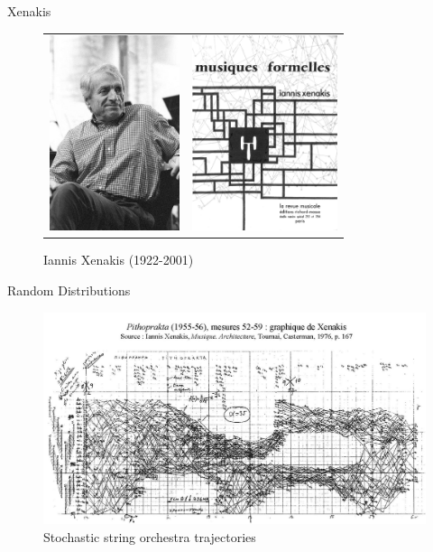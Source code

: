 \begin{frame}{Xenakis}
    \begin{figure}
    \begin{centering}
    \begin{tabular}{cc}
    \includegraphics[height=2.25in]{assets/include-xenakis-portrait.jpg}
    &
    \includegraphics[height=2.25in]{assets/include-xenakis-formalized-music.jpg}
    \end{tabular}
    \caption{Iannis Xenakis (1922-2001)}
    \end{centering}
    \end{figure}
\end{frame}

\begin{frame}{Random Distributions}
    \begin{figure}
    \begin{centering}
    \includegraphics[max width=\linewidth]{assets/include-xenakis-pithoprakta.jpg}
    \caption{Stochastic string orchestra trajectories}
    \end{centering}
    \end{figure}
\end{frame}

